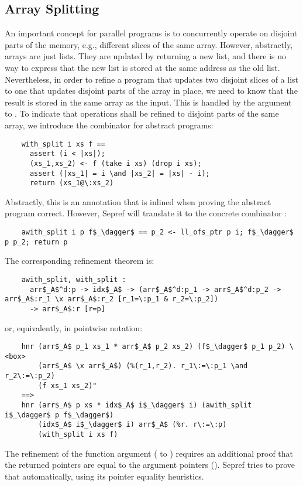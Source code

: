 \documentclass[sn-mathphys,Numbered]{sn-jnl}
\theoremstyle{thmstyleone}%
\theoremstyle{definition}%
\theoremstyle{thmstylethree}%
\begin{document}
  \subsection{Array Splitting}\label{sec:array_split}
  An important concept for parallel programs is to concurrently operate on disjoint parts of the memory,
  e.g., different slices of the same array. However, abstractly, arrays are just lists. They are updated
  by returning a new list, and there is no way to express that the new list is stored at the same address as the old list.
  Nevertheless, in order to refine a program that updates two disjoint slices of a list to one that updates disjoint
  parts of the array in place, we need to know that the result is stored in the same array as the input.
  This is handled by the  argument to . To indicate that operations shall be refined to disjoint parts of the same array, we introduce the
  combinator  for abstract programs:
  \begin{lstlisting}
    with_split i xs f ==
      assert (i < |xs|);
      (xs_1,xs_2) <- f (take i xs) (drop i xs);
      assert (|xs_1| = i \and |xs_2| = |xs| - i);
      return (xs_1@\:xs_2)
  \end{lstlisting}
  Abstractly, this is an annotation that is inlined when proving the abstract program correct.
  However, Sepref will translate it to the concrete combinator :
  \begin{lstlisting}
    awith_split i p f$_\dagger$ == p_2 <- ll_ofs_ptr p i; f$_\dagger$ p p_2; return p
  \end{lstlisting}
  The corresponding refinement theorem is:
  \begin{lstlisting}
    awith_split, with_split :
      arr$_A$^d:p -> idx$_A$ -> (arr$_A$^d:p_1 -> arr$_A$^d:p_2 -> arr$_A$:r_1 \x arr$_A$:r_2 [r_1=\:p_1 & r_2=\:p_2])
      -> arr$_A$:r [r=p]
  \end{lstlisting}
  or, equivalently, in pointwise notation:
  \begin{lstlisting}
    hnr (arr$_A$ p_1 xs_1 * arr$_A$ p_2 xs_2) (f$_\dagger$ p_1 p_2) \<box>
        (arr$_A$ \x arr$_A$) (%(r_1,r_2). r_1\:=\:p_1 \and r_2\:=\:p_2)
        (f xs_1 xs_2)"
    ==>
    hnr (arr$_A$ p xs * idx$_A$ i$_\dagger$ i) (awith_split i$_\dagger$ p f$_\dagger$)
        (idx$_A$ i$_\dagger$ i) arr$_A$ (%r. r\:=\:p)
        (with_split i xs f)
  \end{lstlisting}
  The refinement of the function argument ( to ) requires an additional proof that the returned pointers
  are equal to the argument pointers ().
  Sepref tries to prove that automatically, using its pointer equality heuristics.
\end{document}
